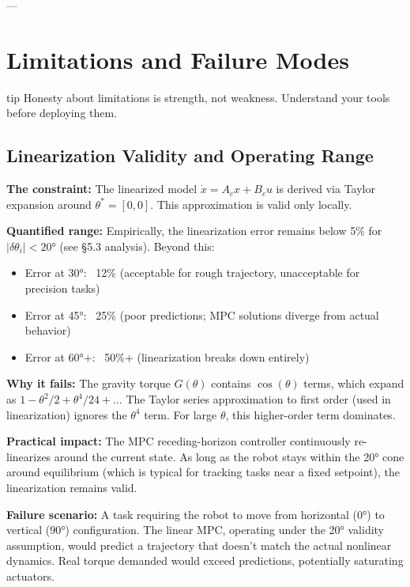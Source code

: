 ---

\section{Limitations and Failure Modes}
\begin{block}{tip}
Honesty about limitations is strength, not weakness. Understand your tools before deploying them.
\end{block}

\label{sec:mpc-limitations}

\subsection{Linearization Validity and Operating Range}

\textbf{The constraint:} The linearized model $\dot{x} = A_c x + B_c u$ is derived via Taylor expansion around $\theta^* = [0, 0]$. This approximation is valid only locally.

\textbf{Quantified range:} Empirically, the linearization error remains below 5\% for $|\delta\theta_i| < 20°$ (see §5.3 analysis). Beyond this:
\begin{itemize}
\item Error at 30°: ~12\% (acceptable for rough trajectory, unacceptable for precision tasks)
\item Error at 45°: ~25\% (poor predictions; MPC solutions diverge from actual behavior)
\item Error at 60°+: ~50\%+ (linearization breaks down entirely)
\end{itemize}

\textbf{Why it fails:} The gravity torque $G(\theta)$ contains $\cos(\theta)$ terms, which expand as $1 - \theta^2/2 + \theta^4/24 + \ldots$ The Taylor series approximation to first order (used in linearization) ignores the $\theta^4$ term. For large $\theta$, this higher-order term dominates.

\textbf{Practical impact:} The MPC receding-horizon controller continuously re-linearizes around the current state. As long as the robot stays within the 20° cone around equilibrium (which is typical for tracking tasks near a fixed setpoint), the linearization remains valid.

\textbf{Failure scenario:} A task requiring the robot to move from horizontal ($0°$) to vertical ($90°$) configuration. The linear MPC, operating under the 20° validity assumption, would predict a trajectory that doesn't match the actual nonlinear dynamics. Real torque demanded would exceed predictions, potentially saturating actuators.

